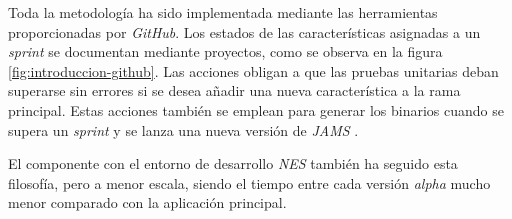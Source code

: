 Toda la metodología ha sido implementada mediante
las herramientas proporcionadas por \textit{GitHub}.
Los estados de las características asignadas a un \textit{sprint}
se documentan mediante proyectos, como se observa en la figura \ref{fig:introduccion-github}.
Las acciones obligan a que las pruebas unitarias deban superarse
sin errores si se desea añadir una nueva característica a la rama principal.
Estas acciones también se emplean para generar los binarios
cuando se supera un \textit{sprint} y se lanza una
nueva versión de \textit{JAMS} .

El componente con el entorno de desarrollo \textit{NES}
también ha seguido esta filosofía, pero a menor escala, siendo el
tiempo entre cada versión \textit{alpha} mucho menor comparado
con la aplicación principal.
